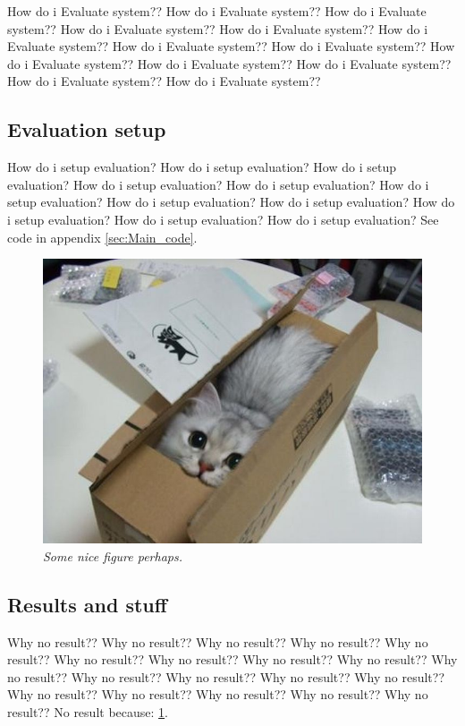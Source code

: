 How do i Evaluate system?? How do i Evaluate system?? How do i Evaluate system?? How do i Evaluate system?? How do i Evaluate system?? How do i Evaluate system?? How do i Evaluate system?? How do i Evaluate system?? How do i Evaluate system?? How do i Evaluate system?? How do i Evaluate system?? How do i Evaluate system?? How do i Evaluate system?? 

\subsection{Evaluation setup}
How do i setup evaluation? How do i setup evaluation? How do i setup evaluation? How do i setup evaluation? How do i setup evaluation? How do i setup evaluation? How do i setup evaluation? How do i setup evaluation? How do i setup evaluation? How do i setup evaluation? How do i setup evaluation? 
See code in appendix \ref{sec:Main_code}. %


\begin{figure}[htb]
	\centering
	\includegraphics[width=\linewidth]{images/acatisfinetoo}
	\caption{\textit{Some nice figure perhaps.}}
	\label{fig:system_evaluation_fig} %
\end{figure}

\subsection{Results and stuff}
Why no result?? Why no result?? Why no result?? Why no result?? Why no result?? Why no result?? Why no result?? 
Why no result?? Why no result?? Why no result?? Why no result?? Why no result?? Why no result?? Why no result?? Why no result?? Why no result?? 
Why no result?? Why no result?? Why no result?? 
No result because: \ref{fig:system_evaluation_fig}. %


